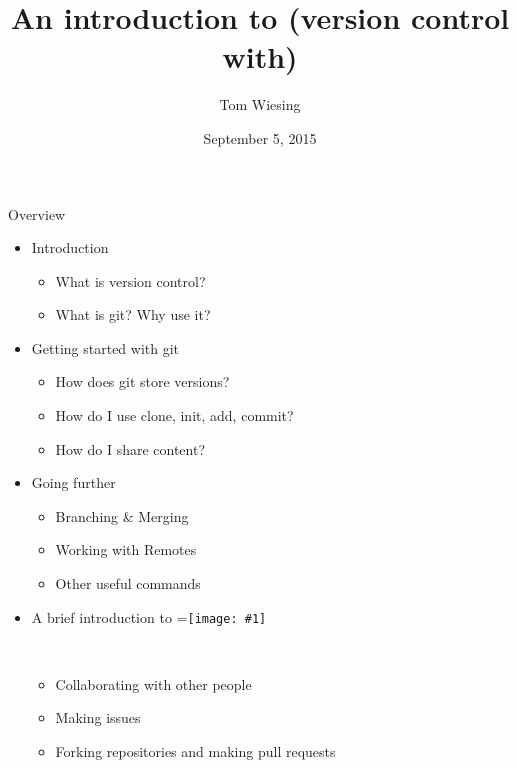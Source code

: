 \documentclass{beamer}
\title{An introduction to (version control with) \logoimage{imgs/git_logo}{40px}}
\author{Tom Wiesing}
\institute{CS Club}
\date{September 5, 2015}
\newcommand{\logoimage}[2]{\begingroup
\setbox0=\hbox{\texttt{[image: \#1]}}%
\parbox{\wd0}{\box0}\endgroup\ }
\newcommand{\github}{\logoimage{imgs/github_logo}{8pt}}
\begin{document}
    \frame{\titlepage}
    
    \begin{frame}{Overview}
      \begin{itemize}
          \item Introduction
          \begin{itemize}
            \item What is version control?
            \item What is git? Why use it?
          \end{itemize}
          \item Getting started with git
          \begin{itemize}
            \item How does git store versions?
            \item How do I use clone, init, add, commit?
            \item How do I share content?
          \end{itemize}
          \item Going further
          \begin{itemize}
            \item Branching \& Merging
            \item Working with Remotes
            \item Other useful commands
          \end{itemize}
          \item A brief introduction to \github
          \begin{itemize}
            \item Collaborating with other people
            \item Making issues
            \item Forking repositories and making pull requests
          \end{itemize}
      \end{itemize}
    \end{frame}
    
    
    
    
    
\end{document}
